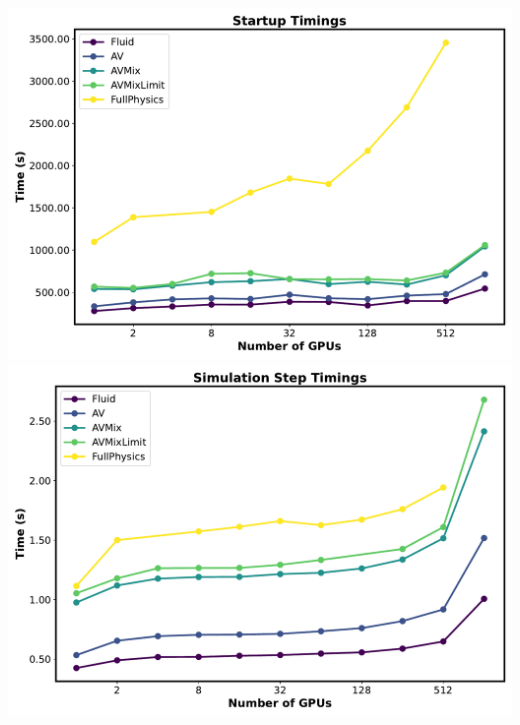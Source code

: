 \begin{frame}
\begin{columns}[T]
    \begin{column}{0.5\textwidth}
      \includegraphics[width=.7\textwidth]{Figures/StartupTimes.pdf}
      \includegraphics[width=.7\textwidth]{Figures/SimulationStepTimes.pdf}
    \end{column}
  \end{columns}
\end{frame}


